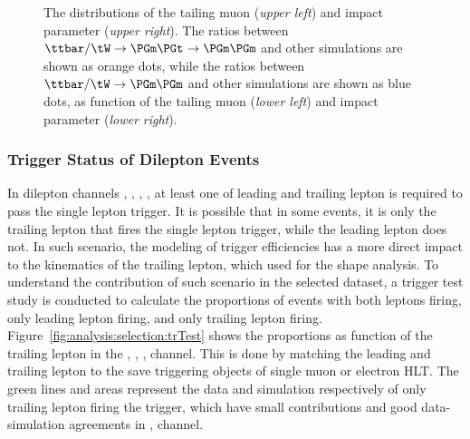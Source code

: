 \begin{figure}[h]
  \caption{The distributions of the tailing muon \pt (\emph{upper left}) and impact parameter (\emph{upper right}). The ratios between $\ttbar/\tW \to \PGm \PGt \to \PGm \PGm$ and other simulations are shown as orange dots, while the ratios between $\ttbar/\tW \to \PGm \PGm$ and other simulations are shown as blue dots, as function of the tailing muon \pt (\emph{lower left}) and impact parameter (\emph{lower right}).
  \label{fig:analysis:selection:sob_mumu_lep2_pt}}
\end{figure}


\subsubsection{Trigger Status of Dilepton Events} 
In dilepton channels \cee, \cmm, \cem, \cme, at least one of leading and trailing lepton is required to pass the single lepton trigger. It is possible that in some events, it is only the trailing lepton that fires the single lepton trigger, while the leading lepton does not. In such scenario, the modeling of trigger efficiencies has a more direct impact to the kinematics of the trailing lepton, which used for the shape analysis.  To understand the contribution of such scenario in the selected dataset, a trigger test study is conducted to calculate the proportions of events with both leptons firing, only leading lepton firing, and only trailing lepton firing. Figure~\ref{fig:analysis:selection:trTest} shows the proportions as function of the trailing lepton \pt in the \cmm, \cee, \cme, \cem channel. This is done by matching the leading and trailing lepton to the save triggering objects of single muon or electron HLT. The green lines and areas represent the data and simulation respectively of only trailing lepton firing the trigger, which have small contributions and good data-simulation agreements in \cee, \cmm channel.

